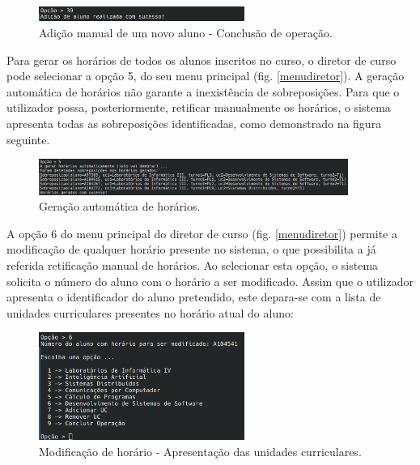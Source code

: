 \documentclass[12pt, a4paper]{article}
\begin{document}
\begin{figure}[H]
    \centering
    \includegraphics[width=0.6\textwidth]{Imagens/Manual/DiretorCurso-4-3.png}
    \caption{Adição manual de um novo aluno - Conclusão de operação.}
    \label{adicaoconcluida}
\end{figure}

Para gerar os horários de todos os alunos inscritos no curso, o diretor de curso pode selecionar a
opção 5, do seu menu principal (fig. \ref{menudiretor}). A geração automática de horários não
garante a inexistência de sobreposições. Para que o utilizador possa, posteriormente, retificar
manualmente os horários, o sistema apresenta todas as sobreposições identificadas, como demonstrado
na figura seguinte.

\begin{figure}[H]
    \centering
    \includegraphics[width=0.9\textwidth]{Imagens/Manual/DiretorCurso-5.png}
    \caption{Geração automática de horários.}
\end{figure}

A opção 6 do menu principal do diretor de curso (fig. \ref{menudiretor}) permite a modificação de
qualquer horário presente no sistema, o que possibilita a já referida retificação manual de
horários. Ao selecionar esta opção, o sistema solicita o número do aluno com o horário a ser
modificado. Assim que o utilizador apresenta o identificador do aluno pretendido, este depara-se com
a lista de unidades curriculares presentes no horário atual do aluno:

\begin{figure}[H]
    \centering
    \includegraphics[width=0.6\textwidth]{Imagens/Manual/DiretorCurso-6.png}
    \caption{Modificação de horário - Apresentação das unidades curriculares.}
\end{figure}
\end{document}
